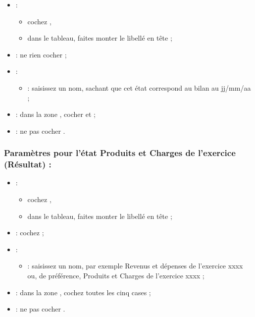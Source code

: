 \begin{itemize}
	\item {} :
		\begin{itemize}
			\item cochez ,				
			\item dans le tableau, faites monter le libellé  en tête ;
		\end{itemize}					
	\item {} : ne rien cocher ;			
	\item {} :
		\begin{itemize}
			\item {} : saisissez un nom, sachant que cet état correspond au bilan au jj/mm/aa ; 
		\end{itemize}									
	\item {} : dans la zone , cocher  et  ;
	\item {} : ne pas cocher .
\end{itemize}

		
\subsubsection {Paramètres pour l'état Produits et Charges de l'exercice (Résultat) :}		
			
\begin{itemize}
	\item {} :
		\begin{itemize}
			\item cochez ,				
			\item dans le tableau, faites monter le libellé  en tête ;
		\end{itemize}					
	\item {} : cochez  ;			
	\item {} :
		\begin{itemize}
			\item {} : saisissez un nom, par exemple \og Revenus et dépenses de l'exercice xxxx \fg{} ou, de préférence, \og Produits et Charges de l'exercice xxxx \fg{} ; 
		\end{itemize}									
	\item {} : dans la zone , cochez toutes les cinq cases ;
	\item {} : ne pas cocher .							
\end{itemize}


